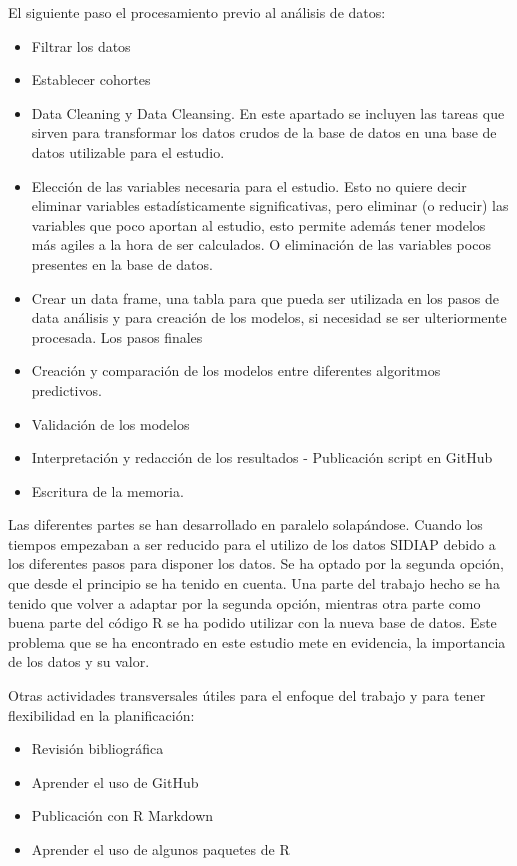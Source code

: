 \documentclass[
]{article}
\begin{document}
El siguiente paso el procesamiento previo al análisis de datos:

\begin{itemize}
\item
  Filtrar los datos
\item
  Establecer cohortes
\item
  Data Cleaning y Data Cleansing. En este apartado se incluyen las
  tareas que sirven para transformar los datos crudos de la base de
  datos en una base de datos utilizable para el estudio.
\item
  Elección de las variables necesaria para el estudio. Esto no quiere
  decir eliminar variables estadísticamente significativas, pero
  eliminar (o reducir) las variables que poco aportan al estudio, esto
  permite además tener modelos más agiles a la hora de ser calculados. O
  eliminación de las variables pocos presentes en la base de datos.
\item
  Crear un data frame, una tabla para que pueda ser utilizada en los
  pasos de data análisis y para creación de los modelos, si necesidad se
  ser ulteriormente procesada. Los pasos finales
\item
  Creación y comparación de los modelos entre diferentes algoritmos
  predictivos.
\item
  Validación de los modelos
\item
  Interpretación y redacción de los resultados - Publicación script en
  GitHub
\item
  Escritura de la memoria.
\end{itemize}

Las diferentes partes se han desarrollado en paralelo solapándose.
Cuando los tiempos empezaban a ser reducido para el utilizo de los datos
SIDIAP debido a los diferentes pasos para disponer los datos. Se ha
optado por la segunda opción, que desde el principio se ha tenido en
cuenta. Una parte del trabajo hecho se ha tenido que volver a adaptar
por la segunda opción, mientras otra parte como buena parte del código R
se ha podido utilizar con la nueva base de datos. Este problema que se
ha encontrado en este estudio mete en evidencia, la importancia de los
datos y su valor.

Otras actividades transversales útiles para el enfoque del trabajo y
para tener flexibilidad en la planificación:

\begin{itemize}
\item
  Revisión bibliográfica
\item
  Aprender el uso de GitHub
\item
  Publicación con R Markdown
\item
  Aprender el uso de algunos paquetes de R
\end{itemize}
\end{document}
